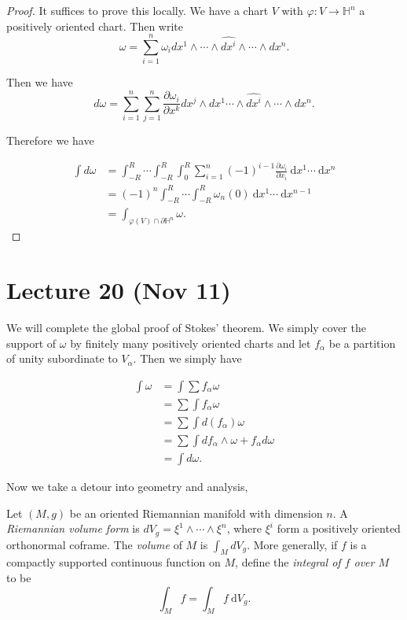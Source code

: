 \documentclass[twoside, 10pt]{article}
\renewcommand{\d}{\ \mathrm{d}}
\renewcommand{\H}{\mathbb{H}}
\begin{document}
    \begin{proof}
        It suffices to prove this locally. We have a chart $V$ with $\varphi:V \to \H^n$ a positively oriented chart. Then write \[\omega = \sum_{i=1}^n \omega_i dx^1 \wedge \cdots \wedge \widehat{dx^i} \wedge \cdots \wedge dx^n.\]

        Then we have 
        \[d\omega = \sum_{i=1}^n \sum_{j=1}^n \frac{\partial \omega_i}{\partial x^k} dx^j \wedge dx^1 \cdots \wedge \widehat{dx^i} \wedge \cdots \wedge dx^n.\]

        Therefore we have 

        \begin{align*}
            \int d \omega &= \int_{-R}^R \cdots \int_{-R}^R \int_0^R \sum_{i=1}^n (-1)^{i-1} \frac{\partial \omega_i}{\partial x_i} \d x^1 \cdots \d x^n \\
                          &= (-1)^n \int_{-R}^R \cdots \int_{-R}^R \omega_n(0) \d x^1 \cdots \d x^{n-1} \\
                          &= \int_{\varphi(V) \cap \partial \H^n} \omega.
        \end{align*}
    \end{proof}

    \section{Lecture 20 (Nov 11)}%
    \label{sec:lecture_20_nov_11_}

    We will complete the global proof of Stokes' theorem. We simply cover the support of $\omega$ by finitely many positively oriented charts and let $f_{\alpha}$ be a partition of unity subordinate to $V_{\alpha}$. Then we simply have

    \begin{align*}
        \int \omega &= \int \sum f_{\alpha} \omega \\
                    &= \sum \int f_{\alpha} \omega \\
                    &= \sum \int d (f_{\alpha}) \omega \\
                    &= \sum \int df_{\alpha} \wedge \omega + f_{\alpha} d\omega \\
                    &= \int d\omega.
    \end{align*}

    Now we take a detour into geometry and analysis,

    \begin{defn}
        Let $(M,g)$ be an oriented Riemannian manifold with dimension $n$. A \textit{Riemannian volume form} is $dV_g = \xi^1 \wedge \cdots \wedge \xi^n$, where $\xi^i$ form a positively oriented orthonormal coframe. The \textit{volume} of $M$ is $\int_M dV_g$. More generally, if $f$ is a compactly supported continuous function on $M$, define the \textit{integral of $f$ over $M$} to be
        \[ \int_M f = \int_M f\d V_g.\]
    \end{defn}
\end{document}
